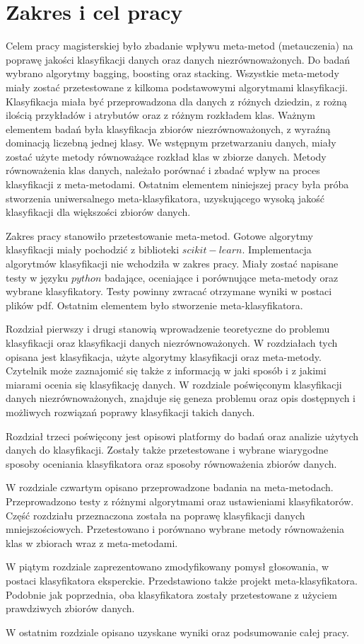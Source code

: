 \chapter*{Zakres i cel pracy}
Celem pracy magisterskiej było zbadanie wpływu meta-metod (metauczenia) na poprawę jakości klasyfikacji danych oraz danych niezrównoważonych. Do badań wybrano algorytmy bagging, boosting oraz stacking. Wszystkie meta-metody miały zostać przetestowane z kilkoma podstawowymi algorytmami klasyfikacji. Klasyfikacja miała być przeprowadzona dla danych z różnych dziedzin, z rożną ilością przykładów i atrybutów oraz z różnym rozkładem klas. Ważnym elementem badań była klasyfikacja zbiorów niezrównoważonych, z wyraźną dominacją liczebną jednej klasy. We wstępnym przetwarzaniu danych, miały zostać użyte metody równoważące rozkład klas w zbiorze danych. Metody równoważenia klas danych, należało porównać i zbadać wpływ na proces klasyfikacji z meta-metodami. Ostatnim elementem niniejszej pracy była próba stworzenia uniwersalnego meta-klasyfikatora, uzyskującego wysoką jakość klasyfikacji dla większości zbiorów danych. \par
Zakres pracy stanowiło przetestowanie meta-metod. Gotowe algorytmy klasyfikacji miały pochodzić z biblioteki $scikit-learn$. Implementacja algorytmów klasyfikacji nie wchodziła w zakres pracy. Miały zostać napisane testy w języku $python$ badające, oceniające i porównujące meta-metody oraz wybrane klasyfikatory. Testy powinny zwracać otrzymane wyniki w postaci plików pdf. Ostatnim elementem było stworzenie meta-klasyfikatora. \par
Rozdział pierwszy i drugi stanowią wprowadzenie teoretyczne do problemu klasyfikacji oraz klasyfikacji danych niezrównoważonych. W rozdziałach tych opisana jest klasyfikacja, użyte algorytmy klasyfikacji oraz meta-metody. Czytelnik może zaznajomić się także z informacją w jaki sposób i z jakimi miarami ocenia się klasyfikację danych. W rozdziale poświęconym klasyfikacji danych niezrównoważonych, znajduje się geneza problemu oraz opis dostępnych i możliwych rozwiązań poprawy klasyfikacji takich danych. \par
Rozdział trzeci poświęcony jest opisowi platformy do badań oraz analizie użytych danych do klasyfikacji. Zostały także przetestowane i wybrane wiarygodne sposoby oceniania klasyfikatora oraz sposoby równoważenia zbiorów danych. \par
W rozdziale czwartym opisano przeprowadzone badania na meta-metodach. Przeprowadzono testy z różnymi algorytmami oraz ustawieniami klasyfikatorów. Część rozdziału przeznaczona została na poprawę klasyfikacji danych mniejszościowych. Przetestowano i porównano wybrane metody równoważenia klas w zbiorach wraz z meta-metodami. \par
W piątym rozdziale zaprezentowano zmodyfikowany pomysł głosowania, w postaci klasyfikatora eksperckie. Przedstawiono także projekt meta-klasyfikatora. Podobnie jak poprzednia, oba klasyfikatora zostały przetestowane z użyciem prawdziwych zbiorów danych. \par
W ostatnim rozdziale opisano uzyskane wyniki oraz podsumowanie całej pracy.